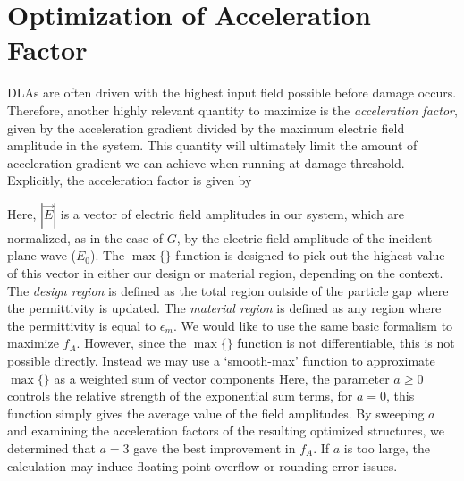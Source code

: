 \section{Optimization of Acceleration Factor}

DLAs are often driven with the highest input field possible before damage occurs.
Therefore, another highly relevant quantity to maximize is the \textit{acceleration factor}, given by the acceleration gradient divided by the maximum electric field amplitude in the system.
This quantity will ultimately limit the amount of acceleration gradient we can achieve when running at damage threshold.
Explicitly, the acceleration factor is given by

%
Here, $|\vec{E}|$ is a vector of electric field amplitudes in our system, which are normalized, as in the case of $G$, by the electric field amplitude of the incident plane wave ($E_0$).
The $\max\{\}$ function is designed to pick out the highest value of this vector in either our design or material region, depending on the context.
The \textit{design region} is defined as the total region outside of the particle gap where the permittivity is updated.
The \textit{material region} is defined as any region where the permittivity is equal to $\epsilon_m$.
We would like to use the same basic formalism to maximize $f_{A}$.
However, since the $\max\{\}$ function is not differentiable, this is not possible directly.
Instead we may use a `smooth-max' function to approximate $\max\{\}$ as a weighted sum of vector components
%
%
Here, the parameter $a \geq 0$ controls the relative strength of the exponential sum terms, for $a = 0$, this function simply gives the average value of the field amplitudes.
By sweeping $a$ and examining the acceleration factors of the resulting optimized structures, we determined that $a = 3$ gave the best improvement in $f_A$.
If $a$ is too large, the calculation may induce floating point overflow or rounding error issues.


